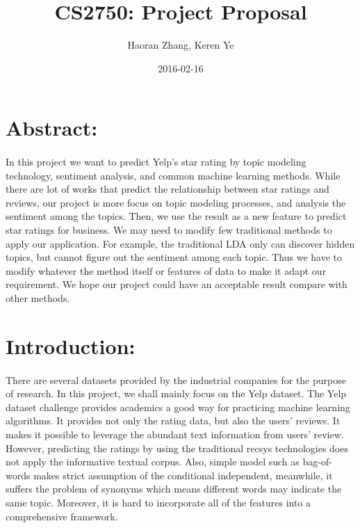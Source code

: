 \documentclass{article}
\title{CS2750: Project Proposal}
\author{Haoran Zhang, Keren Ye}
\date{2016-02-16}
\begin{document}
\maketitle



\section*{Abstract:}
\paragraph{} In this project we want to predict Yelp’s star rating by topic modeling technology, sentiment analysis, and common machine learning methods. While there are lot of works that predict the relationship between star ratings and reviews, our project is more focus on topic modeling processes, and analysis the sentiment among the topics. Then, we use the result as a new feature to predict star ratings for business. We may need to modify few traditional methods to apply our application. For example, the traditional LDA only can discover hidden topics, but cannot figure out the sentiment among each topic. Thus we have to modify whatever the method itself or features of data to make it adapt our requirement. We hope our project could have an acceptable result compare with other methods.



\section*{Introduction:}
\paragraph{} There are several datasets provided by the industrial companies for the purpose of research. In this project, we shall mainly focus on the Yelp dataset. The Yelp dataset challenge provides academics a good way for practicing machine learning algorithms. It provides not only the rating data, but also the users’ reviews. It makes it possible to leverage the abundant text information from users’ review. However, predicting the ratings by using the traditional recsys technologies does not apply the informative textual corpus. Also, simple model such as bag-of-words makes strict assumption of the conditional independent, meanwhile, it suffers the problem of synonyms which means different words may indicate the same topic. Moreover, it is hard to incorporate all of the features into a comprehensive framework.
\end{document}
